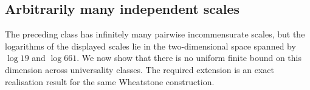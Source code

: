 \subsection{Arbitrarily many independent scales}
The preceding class has infinitely many pairwise incommensurate scales, but the logarithms of the displayed scales lie in the two-dimensional space spanned by $\log19$ and $\log661$. We now show that there is no uniform finite bound on this dimension across universality classes. The required extension is an exact realisation result for the same Wheatstone construction.

